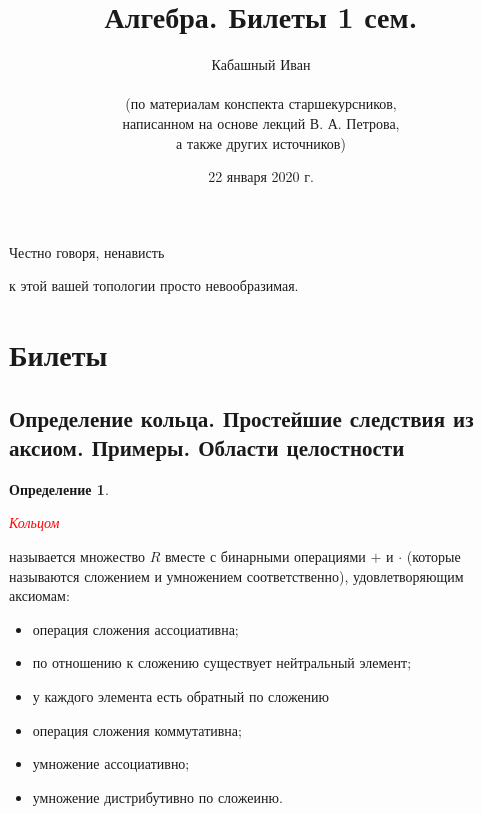 \documentclass[a4paper,100pt]{article}
\title{Алгебра. Билеты 1 сем.}
\author{Кабашный Иван\\ \\ (по материалам конспекта старшекурсников, \\ написанном на основе лекций В. А. Петрова,\\ а также других источников)}
\date{22 января 2020 г.}
\theoremstyle{indented}
\theoremstyle{definition}
\newtheorem{defn}{Определение}
\theoremstyle{remark}
\begin{document}
\newcommand{\resetexlcounters}{%
  \setcounter{exl}{0}%
} 

\newcommand{\resetremarkcounters}{%
  \setcounter{remark}{0}%
} 

\newcommand{\reseconscounters}{%
  \setcounter{cons}{0}%
} 

\newcommand{\resetall}{%
    \resetexlcounters
    \resetremarkcounters
    \reseconscounters%
}

\maketitle 

\newpage

\hypertarget{t1}{Честно говоря, ненависть} к этой вашей топологии просто невообразимая.
\tableofcontents

\newpage



\section{Билеты}



\subsection{Определение кольца. Простейшие следствия из аксиом. Примеры. Области целостности}

\medskip

\begin{defn}
    \hypertarget{n1}{\textcolor{red}{\textit{Кольцом}}} называется множество $R$ вместе с бинарными операциями $+$ и $\cdot$ (которые называются сложением и умножением соответственно), удовлетворяющим аксиомам:\

    \begin{itemize}
        \item операция сложения ассоциативна;
        \item по отношению к сложению существует нейтральный элемент;
        \item у каждого элемента есть обратный по сложению
        \item операция сложения коммутативна;
        \item умножение ассоциативно;
        \item умножение дистрибутивно по сложеиню.
    \end{itemize}
\end{defn}
\end{document}
